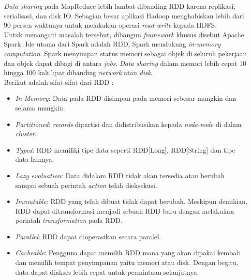\textit{Data sharing} pada MapReduce lebih lambat dibanding RDD  karena replikasi, serialisasi, dan disk IO. Sebagian besar aplikasi Hadoop menghabiskan lebih dari 90 persen waktunya untuk melakukan operasi \textit{read-write} kepada HDFS.\\

Untuk menangani masalah tersebut, dibangun \textit{framework} khusus disebut Apache Spark. Ide utama dari Spark adalah RDD, Spark mendukung \textit{in-memory computation}. Spark menyimpan status memori sebagai objek di seluruh pekerjaan dan objek dapat dibagi di antara \textit{jobs}. \textit{Data sharing} dalam memori lebih cepat 10 hingga 100 kali lipat dibanding \textit{network} atau \textit{disk}.\\

Berikut adalah sifat-sifat dari RDD :
\begin{itemize}

\item \textit{In Memory}: Data pada RDD disimpan pada memori sebesar mungkin dan selama mungkin.

\item \textit{Partitioned}: \textit{records} dipartisi dan didistribusikan kepada \textit{node}-\textit{node} di dalam \textit{cluster}.

\item \textit{Typed}: RDD memiliki tipe data seperti RDD[Long], RDD[String] dan tipe data lainnya.

\item \textit{Lazy evaluation}: Data didalam RDD tidak akan tersedia atau berubah sampai sebuah perintah \textit{action} telah dieksekusi.

\item \textit{Immutable}: RDD yang telah dibuat tidak dapat berubah. Meskipun demikian, RDD
dapat ditransformasi menjadi sebuah RDD baru dengan melakukan perintah \textit{transformation}
pada RDD.

\item \textit{Parallel}: RDD dapat dioperasikan secara paralel.

\item \textit{Cacheable}: Pengguna dapat memilih RDD mana yang akan dipakai kembali dan memilih tempat penyimpanan yaitu memori atau disk. Dengan begitu, data dapat diakses lebih cepat untuk permintaan selanjutnya.\\

\end{itemize}

